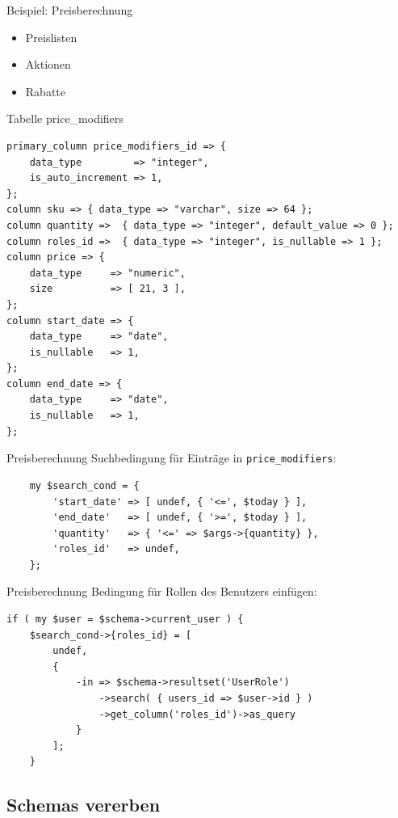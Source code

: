 \begin{frame}{Beispiel: Preisberechnung}
  \begin{itemize}
  \item Preislisten
  \item Aktionen
  \item Rabatte
  \end{itemize}
\end{frame}

\begin{frame}[fragile]{Tabelle price\_modifiers}
\begin{lstlisting}
primary_column price_modifiers_id => {
    data_type         => "integer",
    is_auto_increment => 1,
};
column sku => { data_type => "varchar", size => 64 };
column quantity =>  { data_type => "integer", default_value => 0 };
column roles_id =>  { data_type => "integer", is_nullable => 1 };
column price => {
    data_type     => "numeric",
    size          => [ 21, 3 ],
};
column start_date => {
    data_type     => "date",
    is_nullable   => 1,
};
column end_date => {
    data_type     => "date",
    is_nullable   => 1,
};
\end{lstlisting}
\end{frame}

\begin{frame}[fragile]{Preisberechnung}
Suchbedingung für Einträge in \verb|price_modifiers|:
\begin{lstlisting}
    my $search_cond = {
        'start_date' => [ undef, { '<=', $today } ],
        'end_date'   => [ undef, { '>=', $today } ],
        'quantity'   => { '<=' => $args->{quantity} },
        'roles_id'   => undef,
    };
\end{lstlisting}
\end{frame}


\begin{frame}[fragile]{Preisberechnung}
Bedingung für Rollen des Benutzers einfügen:

\begin{lstlisting}
if ( my $user = $schema->current_user ) {
    $search_cond->{roles_id} = [
        undef,
        {
            -in => $schema->resultset('UserRole')
                ->search( { users_id => $user->id } )
                ->get_column('roles_id')->as_query
            }
        ];
    }

\end{lstlisting}
\end{frame}

\subsection{Schemas vererben}

